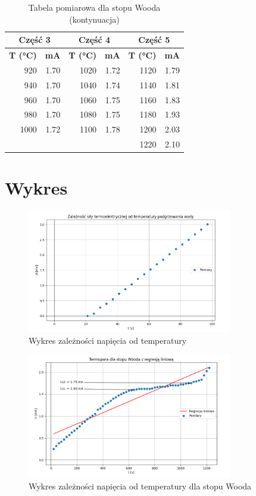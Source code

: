 \documentclass[11pt]{article}
\begin{document}
\begin{table}[ht]
\centering
\footnotesize
\setlength{\tabcolsep}{4pt}
\renewcommand{\arraystretch}{0.8}
\caption{Tabela pomiarowa dla stopu Wooda (kontynuacja)}
\begin{tabular}{|r|r||r|r||r|r|}
\hline
\multicolumn{2}{|c||}{\textbf{Część 3}} & \multicolumn{2}{c||}{\textbf{Część 4}} & \multicolumn{2}{c|}{\textbf{Część 5}} \\
\hline
\textbf{T (°C)} & \textbf{mA} & \textbf{T (°C)} & \textbf{mA} & \textbf{T (°C)} & \textbf{mA} \\
\hline
920 & 1.70 & 1020 & 1.72 & 1120 & 1.79 \\
940 & 1.70 & 1040 & 1.74 & 1140 & 1.81 \\
960 & 1.70 & 1060 & 1.75 & 1160 & 1.83 \\
980 & 1.70 & 1080 & 1.75 & 1180 & 1.93 \\
1000 & 1.72 & 1100 & 1.78 & 1200 & 2.03 \\
& & & & 1220 & 2.10 \\
\hline
\end{tabular}
\end{table}

\section*{Wykres}
\begin{figure}[H]
    \centering
    \includegraphics[width=0.8\textwidth]{woda.png}
    \caption{Wykres zależności napięcia od temperatury}
    \label{fig:wykres}
\end{figure}
\FloatBarrier
\begin{figure}[H]
    \centering
    \includegraphics[width=0.8\textwidth]{stopWooda.png}
    \caption{Wykres zależności napięcia od temperatury dla stopu Wooda}
    \label{fig:wykres2}
\end{figure}
\FloatBarrier
\end{document}
